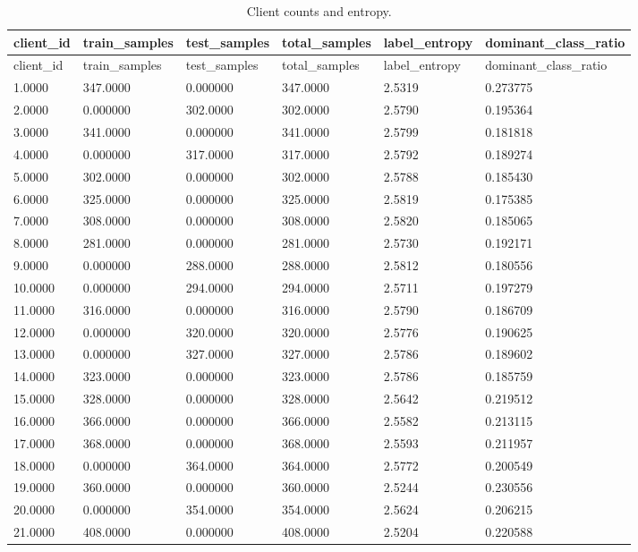 \documentclass[11pt]{report}
\begin{document}
\begin{longtable}{llllll}
\caption{Client counts and entropy.}\\
\toprule
client\_id & train\_samples & test\_samples & total\_samples & label\_entropy & dominant\_class\_ratio \\
\midrule
\endfirsthead
\toprule
client\_id & train\_samples & test\_samples & total\_samples & label\_entropy & dominant\_class\_ratio \\
\midrule
\endhead
1.0000 & 347.0000 & 0.000000 & 347.0000 & 2.5319 & 0.273775 \\
2.0000 & 0.000000 & 302.0000 & 302.0000 & 2.5790 & 0.195364 \\
3.0000 & 341.0000 & 0.000000 & 341.0000 & 2.5799 & 0.181818 \\
4.0000 & 0.000000 & 317.0000 & 317.0000 & 2.5792 & 0.189274 \\
5.0000 & 302.0000 & 0.000000 & 302.0000 & 2.5788 & 0.185430 \\
6.0000 & 325.0000 & 0.000000 & 325.0000 & 2.5819 & 0.175385 \\
7.0000 & 308.0000 & 0.000000 & 308.0000 & 2.5820 & 0.185065 \\
8.0000 & 281.0000 & 0.000000 & 281.0000 & 2.5730 & 0.192171 \\
9.0000 & 0.000000 & 288.0000 & 288.0000 & 2.5812 & 0.180556 \\
10.0000 & 0.000000 & 294.0000 & 294.0000 & 2.5711 & 0.197279 \\
11.0000 & 316.0000 & 0.000000 & 316.0000 & 2.5790 & 0.186709 \\
12.0000 & 0.000000 & 320.0000 & 320.0000 & 2.5776 & 0.190625 \\
13.0000 & 0.000000 & 327.0000 & 327.0000 & 2.5786 & 0.189602 \\
14.0000 & 323.0000 & 0.000000 & 323.0000 & 2.5786 & 0.185759 \\
15.0000 & 328.0000 & 0.000000 & 328.0000 & 2.5642 & 0.219512 \\
16.0000 & 366.0000 & 0.000000 & 366.0000 & 2.5582 & 0.213115 \\
17.0000 & 368.0000 & 0.000000 & 368.0000 & 2.5593 & 0.211957 \\
18.0000 & 0.000000 & 364.0000 & 364.0000 & 2.5772 & 0.200549 \\
19.0000 & 360.0000 & 0.000000 & 360.0000 & 2.5244 & 0.230556 \\
20.0000 & 0.000000 & 354.0000 & 354.0000 & 2.5624 & 0.206215 \\
21.0000 & 408.0000 & 0.000000 & 408.0000 & 2.5204 & 0.220588 \\

\end{longtable}
\end{document}
